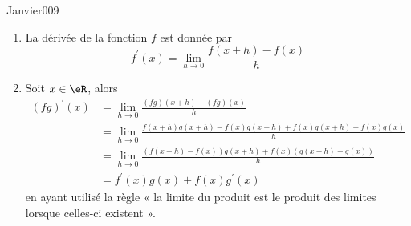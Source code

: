\begin{corrige}{Janvier009}


\begin{enumerate}
\item
La dérivée de la fonction $f$ est donnée par
  \begin{equation*}
    f^\prime(x) = \lim_{h\to 0} \frac{f(x+h) - f(x)}{h}
  \end{equation*}
\item Soit $x \in \eR$, alors
  \begin{equation*}
    \begin{split}
      (fg)^\prime(x) &= \lim_{h\to 0} \frac{(fg)(x+h) -
        (fg)(x)}{h}\\
      &= \lim_{h\to 0} \frac{f(x+h)g(x+h) - f(x) g(x+h) + f(x)
        g(x+h)
        - f(x)g(x)}{h}\\
      &= \lim_{h\to 0} \frac{(f(x+h) - f(x)) g(x+h) + f(x) (g(x+h)
        - g(x))}{h}\\
      &= f^\prime(x)g(x) + f(x) g^\prime(x)
    \end{split}
  \end{equation*}
en ayant utilisé la règle « la limite du produit est le produit des limites lorsque celles-ci existent ».
\end{enumerate}

\end{corrige}
